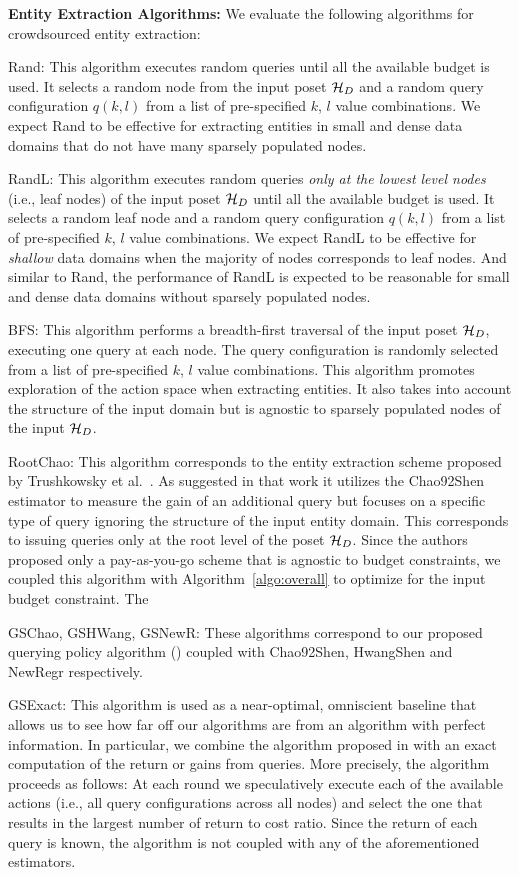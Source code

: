\vspace{5pt}\noindent\textbf{Entity Extraction Algorithms:} We evaluate the following algorithms for crowdsourced entity extraction:
\squishlist
\item Rand: This algorithm executes random queries until all the available budget is used. It selects a random node from the input poset $\mathcal{H}_D$ and a random query configuration $q(k,l)$ from a list of pre-specified $k$, $l$ value combinations. We expect Rand to be effective for extracting entities in small and dense data domains that do not have many sparsely populated nodes.
\item RandL: This algorithm executes random queries {\em only at the lowest level nodes} (i.e., leaf nodes) of the input poset $\mathcal{H}_D$ until all the available budget is used. It selects a random leaf node and a random query configuration $q(k,l)$ from a list of pre-specified $k$, $l$ value combinations. We expect RandL to be effective for {\em shallow} data domains when the majority of nodes corresponds to leaf nodes. And similar to Rand, the performance of RandL is expected to be reasonable for small and dense data domains without sparsely populated nodes.
\item BFS: This algorithm performs a breadth-first traversal of the input poset $\mathcal{H}_D$, executing one query at each node. The query configuration is randomly selected from a list of pre-specified $k$, $l$ value combinations. This algorithm promotes exploration of the action space when extracting entities. It also takes into account the structure of the input domain but is agnostic to sparsely populated nodes of the input $\mathcal{H}_D$.
\item RootChao: This algorithm corresponds to the entity extraction scheme proposed by Trushkowsky et al.~\cite{trushkowsky:2013}. As suggested in that work it utilizes the Chao92Shen estimator to measure the gain of an additional query but focuses on a specific type of query ignoring the structure of the input entity domain. This corresponds to issuing queries only at the root level of the poset $\mathcal{H}_D$. Since the authors proposed only a pay-as-you-go scheme that is agnostic to budget constraints, we coupled this algorithm with Algorithm~\ref{algo:overall} to optimize for the input budget constraint. The 
\item GSChao, GSHWang, GSNewR: These algorithms correspond to our proposed querying policy algorithm () coupled with Chao92Shen, HwangShen and NewRegr respectively.
\item GSExact: This algorithm is used as a near-optimal, omniscient baseline that allows us to see how far off our algorithms are from an algorithm with perfect information. In particular, we combine the algorithm proposed in  with an exact computation of the return or gains from queries. More precisely, the algorithm proceeds as follows: At each round we speculatively execute each of the available actions (i.e., all query configurations across all nodes) and select the one that results in the largest number of return to cost ratio. Since the return of each query is known, the algorithm is not coupled with any of the aforementioned estimators.
\squishend

